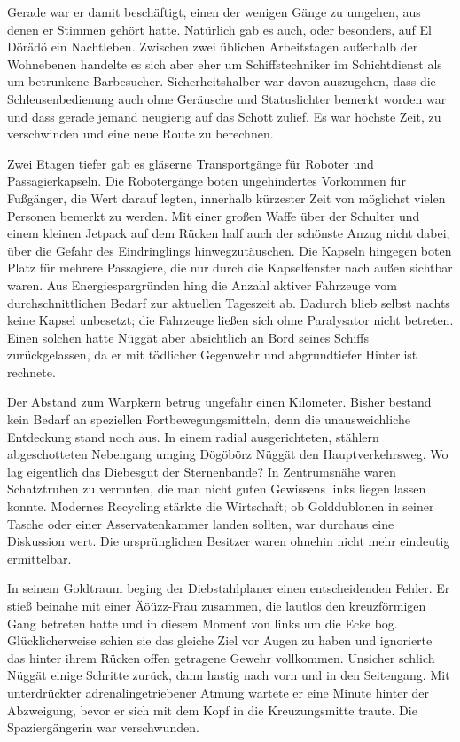 Gerade war er damit beschäftigt, einen der wenigen Gänge zu umgehen, aus denen er Stimmen gehört hatte. Natürlich gab es auch, oder besonders, auf El Dörädö ein Nachtleben. Zwischen zwei üblichen Arbeitstagen außerhalb der Wohnebenen handelte es sich aber eher um Schiffstechniker im Schichtdienst als um betrunkene Barbesucher. Sicherheitshalber war davon auszugehen, dass die Schleusenbedienung auch ohne Geräusche und Statuslichter bemerkt worden war und dass gerade jemand neugierig auf das Schott zulief. Es war höchste Zeit, zu verschwinden und eine neue Route zu berechnen.

Zwei Etagen tiefer gab es gläserne Transportgänge für Roboter und Passagierkapseln. Die Robotergänge boten ungehindertes Vorkommen für Fußgänger, die Wert darauf legten, innerhalb kürzester Zeit von möglichst vielen Personen bemerkt zu werden. Mit einer großen Waffe über der Schulter und einem kleinen Jetpack auf dem Rücken half auch der schönste Anzug nicht dabei, über die Gefahr des Eindringlings hinwegzutäuschen. Die Kapseln hingegen boten Platz für mehrere Passagiere, die nur durch die Kapselfenster nach außen sichtbar waren. Aus Energiespargründen hing die Anzahl aktiver Fahrzeuge vom durchschnittlichen Bedarf zur aktuellen Tageszeit ab. Dadurch blieb selbst nachts keine Kapsel unbesetzt; die Fahrzeuge ließen sich ohne Paralysator nicht betreten. Einen solchen hatte Nüggät aber absichtlich an Bord seines Schiffs zurückgelassen, da er mit tödlicher Gegenwehr und abgrundtiefer Hinterlist rechnete.

Der Abstand zum Warpkern betrug ungefähr einen Kilometer. Bisher bestand kein Bedarf an speziellen Fortbewegungsmitteln, denn die unausweichliche Entdeckung stand noch aus. In einem radial ausgerichteten, stählern abgeschotteten Nebengang umging Dögöbörz Nüggät den Hauptverkehrsweg. Wo lag eigentlich das Diebesgut der Sternenbande? In Zentrumsnähe waren Schatztruhen zu vermuten, die man nicht guten Gewissens links liegen lassen konnte. Modernes Recycling stärkte die Wirtschaft; ob Golddublonen in seiner Tasche oder einer Asservatenkammer landen sollten, war durchaus eine Diskussion wert. Die ursprünglichen Besitzer waren ohnehin nicht mehr eindeutig ermittelbar.

In seinem Goldtraum beging der Diebstahlplaner einen entscheidenden Fehler. Er stieß beinahe mit einer Äöüzz-Frau zusammen, die lautlos den kreuzförmigen Gang betreten hatte und in diesem Moment von links um die Ecke bog. Glücklicherweise schien sie das gleiche Ziel vor Augen zu haben und ignorierte das hinter ihrem Rücken offen getragene Gewehr vollkommen. Unsicher schlich Nüggät einige Schritte zurück, dann hastig nach vorn und in den Seitengang. Mit unterdrückter adrenalingetriebener Atmung wartete er eine Minute hinter der Abzweigung, bevor er sich mit dem Kopf in die Kreuzungsmitte traute. Die Spaziergängerin war verschwunden.

